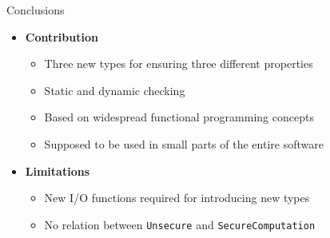 \begin{frame}{Conclusions}
	\begin{itemize}
		\item \textbf{Contribution}
		\begin{itemize}
			\item Three new types for ensuring three different properties
			\item Static and dynamic checking
			\item Based on widespread functional programming concepts
			\item Supposed to be used in small parts of the entire software
		\end{itemize}
		\vspace{0.5cm}
		\item<2-> \textbf{Limitations}
			\begin{itemize}
				\item New I/O functions required for introducing new types
				\item No relation between \texttt{Unsecure} and \texttt{SecureComputation}
			\end{itemize}
	\end{itemize}
\end{frame}